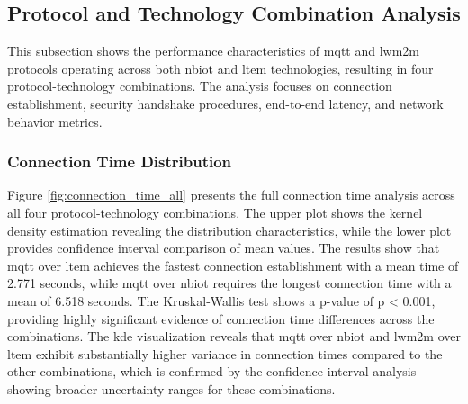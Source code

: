 \documentclass[12pt, english, openany]{book}
\begin{document}
\FloatBarrier
\subsection{Protocol and Technology Combination Analysis} \label{sec:results_by_protocol_technology}

This subsection shows the performance characteristics of \gls{mqtt} and \gls{lwm2m} protocols operating across both \gls{nbiot} and \gls{ltem} technologies, resulting in four protocol-technology combinations. The analysis focuses on connection establishment, security handshake procedures, end-to-end latency, and network behavior metrics.

\subsubsection*{Connection Time Distribution}

Figure \ref{fig:connection_time_all} presents the full connection time analysis across all four protocol-technology combinations. The upper plot shows the kernel density estimation revealing the distribution characteristics, while the lower plot provides confidence interval comparison of mean values. The results show that \gls{mqtt} over \gls{ltem} achieves the fastest connection establishment with a mean time of 2.771 seconds, while \gls{mqtt} over \gls{nbiot} requires the longest connection time with a mean of 6.518 seconds. The Kruskal-Wallis test shows a p-value of p < 0.001, providing highly significant evidence of connection time differences across the combinations. The \gls{kde} visualization reveals that \gls{mqtt} over \gls{nbiot} and \gls{lwm2m} over \gls{ltem} exhibit substantially higher variance in connection times compared to the other combinations, which is confirmed by the confidence interval analysis showing broader uncertainty ranges for these combinations.
\end{document}
